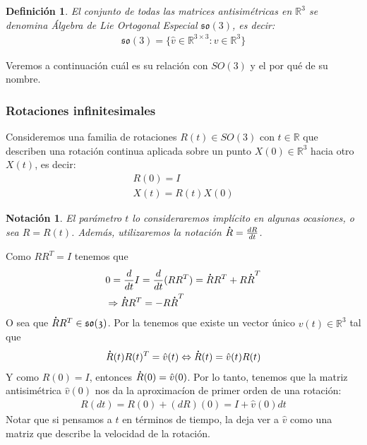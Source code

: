 \documentclass[ twoside,openright,titlepage,numbers=noenddot,%
                headinclude,footinclude,cleardoublepage=empty,abstract=on,
                BCOR=-5mm,paper=a4,fontsize=11pt
                ]{scrreprt}
\newtheorem{definition}[theorem]{Definición}
\newtheorem{notation}[theorem]{Notación}
\newcommand{\R}{\mathbb{R}}
\newcommand{\RR}[1]{\R^{#1 \times #1}}
\newcommand{\so}[1]{\mathfrak{so(#1)}}
\renewcommand{\dot}[1] {\overset{\,_{\mbox{\Large .}}}{#1}}
\begin{document}
\begin{definition}El conjunto de todas las matrices antisimétricas en
\(\R^3\) se denomina Álgebra de Lie Ortogonal Especial \(\so3\), es
decir: \begin{align}
\so3 = \{ \hat{v} \in \RR3 : v \in \R^3 \}
\end{align}\end{definition}

Veremos a continuación cuál es su relación con \(SO(3)\) y el por qué de
su nombre.

\hypertarget{rotaciones-infinitesimales}{%
\subsubsection{Rotaciones
infinitesimales}\label{rotaciones-infinitesimales}}

Consideremos una familia de rotaciones \(R(t) \in SO(3)\) con
\(t \in \R\) que describen una rotación continua aplicada sobre un punto
\(X(0) \in \R^3\) hacia otro \(X(t)\), es decir: \begin{align}
  R(0) = I \\
  X(t) = R(t)X(0)
\end{align}

\begin{notation}El parámetro \(t\) lo consideraremos implícito en
algunas ocasiones, o sea \(R = R(t)\). Además, utilizaremos la notación
\(\dot{R} = \frac{dR}{dt}\).\end{notation}

Como \(RR^T = I\) tenemos que \begin{align}
& 0 = \frac{d}{dt}I = \frac{d}{dt}(RR^T) = \dot{R}R^T + R \dot{R}^T \\
& \Rightarrow \dot{R}R^T = -R \dot{R}^T
\end{align} O sea que \(\dot{R}R^T \in \so3\). Por la
 tenemos que existe un vector único
\(v(t) \in \R^3\) tal que \begin{align}
\dot{R}(t) R(t)^T = \hat{v}(t) \Leftrightarrow \dot{R}(t) = \hat{v}(t) R(t)
\end{align} Y como \(R(0) = I\), entonces \(\dot{R}(0) = \hat{v}(0)\).
Por lo tanto, tenemos que la matriz antisimétrica \(\hat{v}(0)\) nos da
la aproximacíon de primer orden de una rotación: \begin{align}
R(dt) = R(0) + (dR)(0) = I + \hat{v}(0)dt \label{eq:hatop-is-rotvel}
\end{align} Notar que si pensamos a \(t\) en términos de tiempo, la
 deja ver a \(\hat{v}\) como una matriz que
describe la velocidad de la rotación.
\end{document}
